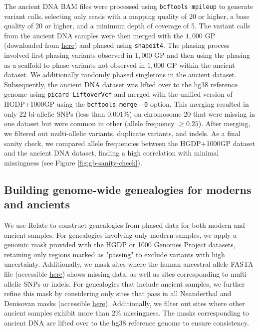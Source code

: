 The ancient DNA BAM files were processed using \texttt{bcftools mpileup} to generate variant calls, selecting only reads with a mapping quality of 20 or higher, a base quality of 20 or higher, and a minimum depth of coverage of 5.
%
The variant calls from the ancient DNA samples were then merged with the $1{,}000$ GP (downloaded from \href{https://ftp.1000genomes.ebi.ac.uk/vol1/ftp/release/20130502/}{here}) and phased using \texttt{shapeit4}. The phasing process involved first phasing variants observed in $1{,}000$ GP and then using the phasing as a scaffold to phase variants not observed in $1{,}000$ GP within the ancient dataset. We additionally randomly phased singletons in the ancient dataset. 
%
Subsequently, the ancient DNA dataset was lifted over to the hg38 reference genome using \texttt{picard LiftoverVcf} and merged with the unified version of HGDP+1000GP using the \texttt{bcftools merge -0} option. This merging resulted in only 22 bi-allelic SNPs (less than $0.001$\%) on chromosome 20 that were missing in one dataset but were common in other (allele frequency $\geq 0.25$). After merging, we filtered out multi-allelic variants, duplicate variants, and indels. As a final sanity check, we compared allele frequencies between the HGDP+1000GP dataset and the ancient DNA dataset, finding a high correlation with minimal missingness (see Figure \ref{fig:gb-sanity-check}).

\subsection{Building genome-wide genealogies for moderns and ancients}

We use Relate \cite{speidel2019method} to construct genealogies from phased data for both modern and ancient samples. For genealogies involving only modern samples, we apply a genomic mask provided with the HGDP or 1000 Genomes Project datasets, retaining only regions marked as "passing" to exclude variants with high uncertainty. Additionally, we mask sites where the human ancestral allele FASTA file (accessible \href{ftp://ftp.ensembl.org/pub/release-74/fasta/ancestral_alleles/homo_sapiens_ancestor_GRCh37_e71.tar.bz2}{here}) shows missing data, as well as sites corresponding to multi-allelic SNPs or indels. For genealogies that include ancient samples, we further refine this mask by considering only sites that pass in all Neanderthal and Denisovan masks (accessible \href{http://ftp.eva.mpg.de/neandertal/}{here}). Additionally, we filter out sites where other ancient samples exhibit more than 2\% missingness. The masks corresponding to ancient DNA are lifted over to the hg38 reference genome to ensure consistency.

